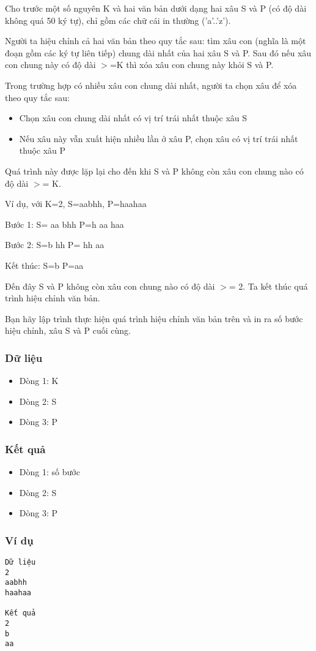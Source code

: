 



   Cho trước một số nguyên K và hai văn bản dưới dạng hai xâu S và P (có độ dài không quá 50 ký tự), chỉ gồm các chữ cái in thường ('a'..'z').  

   Người ta hiệu chỉnh cả hai văn bản theo quy tắc sau: tìm xâu con (nghĩa là một đoạn gồm các ký tự liên tiếp) chung dài nhất của hai xâu S và P. Sau đó nếu xâu con chung này có độ dài $>$=K thì xóa xâu con chung này khỏi S và P.  

   Trong trường hợp có nhiều xâu con chung dài nhất, người ta chọn xâu để xóa theo quy tắc sau:  
\begin{itemize}
	\item     Chọn xâu con chung dài nhất có vị trí trái nhất thuộc xâu S   
	\item     Nếu xâu này vẫn xuất hiện nhiều lần ở xâu P, chọn xâu có vị trí trái nhất thuộc xâu P   
\end{itemize}

   Quá trình này được lặp lại cho đến khi S và P không còn xâu con chung nào có độ dài $>$= K.  

   Ví dụ, với K=2, S=aabhh, P=haahaa  

   Bước 1:  S=       aa      bhh  P=h       aa      haa  

   Bước 2:  S=b       hh      P=       hh      aa  

   Kết thúc: S=b   P=aa  

   Đến đây S và P không còn xâu con chung nào có độ dài $>$= 2. Ta kết thúc quá trình hiệu chỉnh văn bản.  

   Bạn hãy lập trình thực hiện quá trình hiệu chỉnh văn bản trên và in ra số bước hiệu chỉnh, xâu S và P cuối cùng.  

\subsubsection{   Dữ liệu  }
\begin{itemize}
	\item     Dòng 1: K   
	\item     Dòng 2: S   
	\item     Dòng 3: P   
\end{itemize}

\subsubsection{   Kết quả  }
\begin{itemize}
	\item     Dòng 1: số bước   
	\item     Dòng 2: S   
	\item     Dòng 3: P   
\end{itemize}

\subsubsection{   Ví dụ  }
\begin{verbatim}
Dữ liệu
2
aabhh
haahaa

Kết quả
2
b
aa
\end{verbatim}